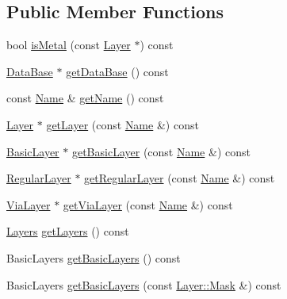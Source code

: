 \subsection*{Public Member Functions}
\begin{DoxyCompactItemize}
\item 
bool \mbox{\hyperlink{classHurricane_1_1Technology_ae5590e455d35f76531a6feb0c0f111a2}{is\+Metal}} (const \mbox{\hyperlink{classHurricane_1_1Layer}{Layer}} $\ast$) const
\item 
\mbox{\hyperlink{classHurricane_1_1DataBase}{Data\+Base}} $\ast$ \mbox{\hyperlink{classHurricane_1_1Technology_acf836e738fba14fa493b0e08148cc3ee}{get\+Data\+Base}} () const
\item 
const \mbox{\hyperlink{classHurricane_1_1Name}{Name}} \& \mbox{\hyperlink{classHurricane_1_1Technology_ae466071aa1991c853ee71af12fa62d4e}{get\+Name}} () const
\item 
\mbox{\hyperlink{classHurricane_1_1Layer}{Layer}} $\ast$ \mbox{\hyperlink{classHurricane_1_1Technology_a4ec69c9f8f6b483885f1900c56a97b61}{get\+Layer}} (const \mbox{\hyperlink{classHurricane_1_1Name}{Name}} \&) const
\item 
\mbox{\hyperlink{classHurricane_1_1BasicLayer}{Basic\+Layer}} $\ast$ \mbox{\hyperlink{classHurricane_1_1Technology_ab096154ce9485cef02244f0037efd4fb}{get\+Basic\+Layer}} (const \mbox{\hyperlink{classHurricane_1_1Name}{Name}} \&) const
\item 
\mbox{\hyperlink{classHurricane_1_1RegularLayer}{Regular\+Layer}} $\ast$ \mbox{\hyperlink{classHurricane_1_1Technology_a0e93f2f749ee9b6efd30de4ef74546cc}{get\+Regular\+Layer}} (const \mbox{\hyperlink{classHurricane_1_1Name}{Name}} \&) const
\item 
\mbox{\hyperlink{classHurricane_1_1ViaLayer}{Via\+Layer}} $\ast$ \mbox{\hyperlink{classHurricane_1_1Technology_a9edd085c08487642dd8745b66cf40c76}{get\+Via\+Layer}} (const \mbox{\hyperlink{classHurricane_1_1Name}{Name}} \&) const
\item 
\mbox{\hyperlink{namespaceHurricane_a7b7200a36ab7ce8a157ddbe78b625f38}{Layers}} \mbox{\hyperlink{classHurricane_1_1Technology_a4e58c5ae8e3e82d7fe1b3bb939d6a633}{get\+Layers}} () const
\item 
Basic\+Layers \mbox{\hyperlink{classHurricane_1_1Technology_a7fccff9da6604fafb90408ba56184fc0}{get\+Basic\+Layers}} () const
\item 
Basic\+Layers \mbox{\hyperlink{classHurricane_1_1Technology_a997457824046ea63eba51210a8e23f85}{get\+Basic\+Layers}} (const \mbox{\hyperlink{classHurricane_1_1Layer_af5277c670637bd5d910237e7afe01a91}{Layer\+::\+Mask}} \&) const

\end{DoxyCompactItemize}

